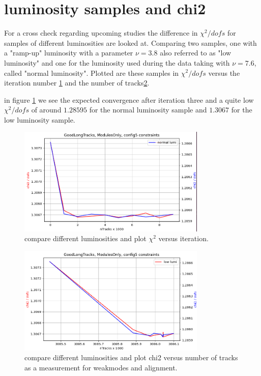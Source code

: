 
\section{luminosity samples and chi2}
For a cross check regarding upcoming studies the difference in $\chi^2 / dofs$ for samples of different luminosities are looked at.
Comparing two samples, one with a "ramp-up" luminosity with a parameter $\nu = 3.8$ also referred to as "low luminosity" and one for the luminosity used during the data taking
with $\nu = 7.6$, called "normal luminosity".
Plotted are these samples in $\chi^2 / dofs$ versus the iteration number \ref{fig:chi2iter_lumi_normal} and the number of tracks\ref{fig:chi2tracks_lumi_normal}.

in figure \ref{fig:chi2iter_lumi_normal} we see the expected convergence after iteration three and a quite low $\chi^2 / dofs$ of around $\num{1.28595}$ for the normal luminosity sample
and $\num{1.3067}$ for the low luminosity sample.

\begin{figure}
  \centering
  \includegraphics[width=0.8\textwidth]{plots/jan_17_2022/chi2_iter_low_vs_normal.png}
  \caption{compare different luminosities and plot $\chi^2$ versus iteration.}
  \label{fig:chi2iter_lumi_normal}
\end{figure}


\begin{figure}
  \centering
  \includegraphics[width=0.8\textwidth]{plots/jan_17_2022/chi2_tracks_modulesOnly.png}
  \caption{compare different luminosities and plot chi2 versus number of tracks as a measurement for weakmodes and alignment.}
  \label{fig:chi2tracks_lumi_normal}
\end{figure}

